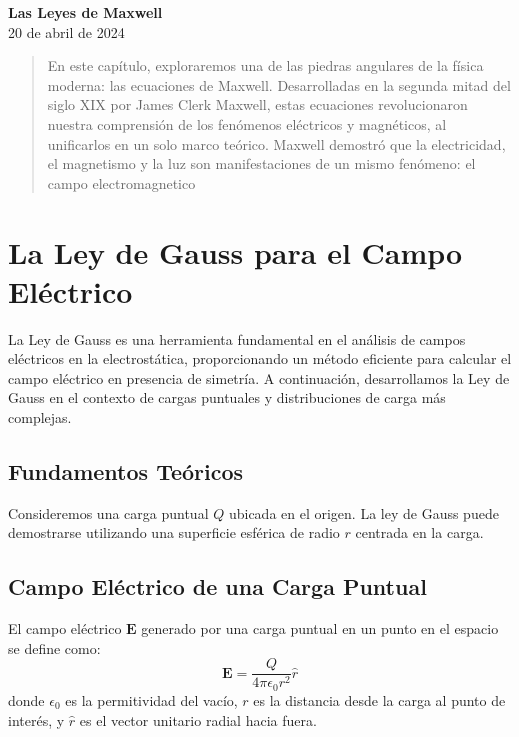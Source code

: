 \documentclass{article}
\begin{document}
	\begin{center}
		\Large \textbf{Las Leyes de Maxwell} \\
		\vspace{1em} %
		\small 20 de abril de 2024
	\end{center}

	\begin{abstract}
		En este capítulo, exploraremos una de las piedras angulares de la física moderna: las ecuaciones de Maxwell. 
		Desarrolladas en la segunda mitad del siglo XIX por James Clerk Maxwell, estas ecuaciones revolucionaron nuestra comprensión de los fenómenos eléctricos y magnéticos, al unificarlos en un solo marco teórico. Maxwell demostró que la electricidad, el magnetismo y la luz son manifestaciones de un mismo fenómeno: el campo electromagnetico
	\end{abstract}
		
	
\section{La Ley de Gauss para el Campo Eléctrico}

La Ley de Gauss es una herramienta fundamental en el análisis de campos eléctricos en la electrostática, proporcionando un método eficiente para calcular el campo eléctrico en presencia de simetría. A continuación, desarrollamos la Ley de Gauss en el contexto de cargas puntuales y distribuciones de carga más complejas.

\subsection{Fundamentos Teóricos}
Consideremos una carga puntual \( Q \) ubicada en el origen. La ley de Gauss puede demostrarse utilizando una superficie esférica de radio \( r \) centrada en la carga.

\subsection{Campo Eléctrico de una Carga Puntual}
El campo eléctrico \( \mathbf{E} \) generado por una carga puntual en un punto en el espacio se define como:
\begin{equation}
	\mathbf{E} = \frac{Q}{4\pi \epsilon_0 r^2} \hat{r}
\end{equation}
donde \( \epsilon_0 \) es la permitividad del vacío, \( r \) es la distancia desde la carga al punto de interés, y \( \hat{r} \) es el vector unitario radial hacia fuera.
\end{document}
